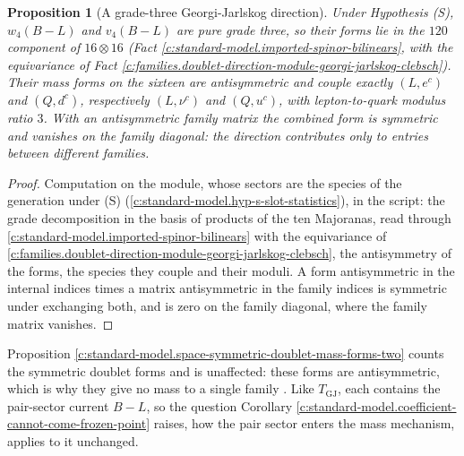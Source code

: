 \documentclass[11pt]{article}
\newtheorem{proposition}[theorem]{Proposition}
\theoremstyle{definition}
\theoremstyle{plain}
\newcommand{\changedmark}[2]{\marginpar{\raggedright\scriptsize\color{#1}#2}}
\begin{document}
\begin{proposition}[A grade-three Georgi-Jarlskog direction]\label{c:standard-model.grade-three-georgi-jarlskog-direction}
\changedmark{gray}{reworded}
Under Hypothesis (S), $w_{4}(B - L)$ and $v_{4}(B - L)$ are pure grade three, so their forms lie in the $120$ component of $16 \otimes 16$ (Fact \ref{c:standard-model.imported-spinor-bilinears}, with the equivariance of Fact \ref{c:families.doublet-direction-module-georgi-jarlskog-clebsch}). Their mass forms on the sixteen are antisymmetric and couple exactly $(L, e^{c})$ and $(Q, d^{c})$, respectively $(L, \nu^{c})$ and $(Q, u^{c})$, with lepton-to-quark modulus ratio $3$. With an antisymmetric family matrix the combined form is symmetric and vanishes on the family diagonal: the direction contributes only to entries between different families.
\end{proposition}
\begin{proof}
Computation on the module, whose sectors are the species of the generation under (S) (\ref{c:standard-model.hyp-s-slot-statistics}), in the script: the grade decomposition in the basis of products of the ten Majoranas, read through \ref{c:standard-model.imported-spinor-bilinears} with the equivariance of \ref{c:families.doublet-direction-module-georgi-jarlskog-clebsch}, the antisymmetry of the forms, the species they couple and their moduli. A form antisymmetric in the internal indices times a matrix antisymmetric in the family indices is symmetric under exchanging both, and is zero on the family diagonal, where the family matrix vanishes.

\end{proof}

\label{c:note.standard-model.setting-weak-angle-pati-salam-route-3}
Proposition \ref{c:standard-model.space-symmetric-doublet-mass-forms-two} counts the symmetric doublet forms and is unaffected: these forms are antisymmetric, which is why they give no mass to a single family \cite[Prop.~8.1(iii)]{ButlerT13}. Like $T_{\mathrm{GJ}}$, each contains the pair-sector current $B - L$, so the question Corollary \ref{c:standard-model.coefficient-cannot-come-frozen-point} raises, how the pair sector enters the mass mechanism, applies to it unchanged.
\end{document}
